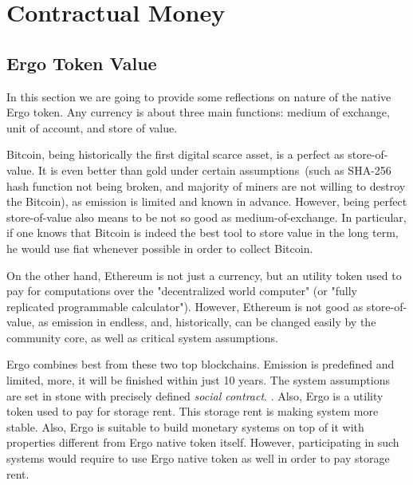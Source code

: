 \section{Contractual Money}
    \label{sec:contractual}




\subsection{Ergo Token Value}
 \label{sec:ergo-value}

 In this section we are going to provide some reflections on nature of the native Ergo token. Any currency is about
 three main functions: medium of exchange, unit of account, and store of value.

 Bitcoin, being historically the first digital scarce asset, is a perfect as store-of-value. It is even better than
 gold under certain assumptions~(such as SHA-256 hash function not being broken, and majority of miners are not willing
 to destroy the Bitcoin), as emission is limited and known in advance. However, being perfect store-of-value also means
 to be not so good as medium-of-exchange. In particular, if one knows that Bitcoin is indeed the best tool to store
 value in the long term, he would use fiat whenever possible in order to collect Bitcoin.

 On the other hand, Ethereum is not just a currency, but an utility token used to pay for computations over the
 "decentralized world computer" (or "fully replicated programmable calculator"). However, Ethereum is not good as
 store-of-value, as emission in endless, and, historically, can be changed easily by the community core, as well as
 critical system assumptions.

 Ergo combines best from these two top blockchains. Emission is predefined and limited, more, it will be finished within
 just 10 years. The system assumptions are set in stone with precisely defined {\em social contract}. . Also,
 Ergo is a utility token used to pay for storage rent. This storage rent is making system more stable. Also, Ergo is
 suitable to build monetary systems on top of it with properties different from Ergo native token itself. However,
 participating in such systems would require to use Ergo native token as well in order to pay storage rent.

